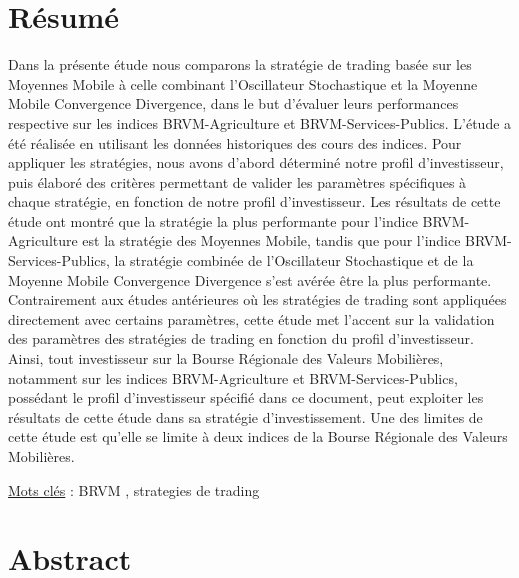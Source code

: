 \chapter*{Résumé}

    Dans la présente étude nous comparons la stratégie de trading 
    basée sur les Moyennes Mobile à celle combinant l'Oscillateur Stochastique 
    et la Moyenne Mobile Convergence Divergence, dans le but d'évaluer leurs performances
    respective sur les indices BRVM-Agriculture et BRVM-Services-Publics. 
    L'étude a été réalisée en utilisant les données historiques des cours des indices.
    Pour appliquer les stratégies, nous avons d'abord déterminé notre profil d'investisseur, 
    puis élaboré des critères permettant de valider les paramètres spécifiques à 
    chaque stratégie, en fonction de notre profil d'investisseur.    
    Les résultats de cette étude ont montré que la stratégie la plus performante pour 
    l'indice BRVM-Agriculture est la stratégie des Moyennes Mobile, tandis que pour 
    l'indice BRVM-Services-Publics, la stratégie combinée de l'Oscillateur Stochastique 
    et de la Moyenne Mobile Convergence Divergence s'est avérée être la plus performante.
    Contrairement aux études antérieures où les stratégies de trading sont appliquées 
    directement avec certains paramètres, cette étude met l'accent sur la validation 
    des paramètres des stratégies de trading en fonction du profil d'investisseur.
    Ainsi, tout investisseur sur la Bourse Régionale des Valeurs Mobilières, notamment 
    sur les indices BRVM-Agriculture et BRVM-Services-Publics, possédant le profil 
    d'investisseur spécifié dans ce document, peut exploiter les résultats de cette 
    étude dans sa stratégie d'investissement.
    Une des limites de cette étude est qu'elle se limite à deux indices de la Bourse 
    Régionale des Valeurs Mobilières.


\underline{Mots clés} : BRVM , strategies de trading

\chapter*{Abstract}

